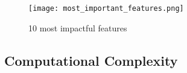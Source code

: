 \begin{figure*}[htbp]
	\centering
	\texttt{[image: most\_important\_features.png]}
	\caption{10 most impactful features}\label{fig:most_important_features}
\end{figure*}
\noindent

\subsection{Computational Complexity}




